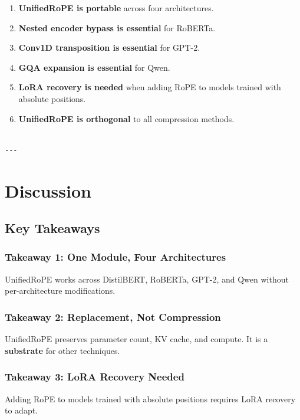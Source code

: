 \begin{enumerate}
\item \textbf{UnifiedRoPE is portable} across four architectures.
\item \textbf{Nested encoder bypass is essential} for RoBERTa.
\item \textbf{Conv1D transposition is essential} for GPT-2.
\item \textbf{GQA expansion is essential} for Qwen.
\item \textbf{LoRA recovery is needed} when adding RoPE to models trained with
  absolute positions.
\item \textbf{UnifiedRoPE is orthogonal} to all compression methods.
\end{enumerate}
\begin{lstlisting}

---
\end{lstlisting}


\section{Discussion}

\subsection{Key Takeaways}

\subsubsection{Takeaway 1: One Module, Four Architectures}

UnifiedRoPE works across DistilBERT, RoBERTa, GPT-2, and Qwen without 
per-architecture modifications.

\subsubsection{Takeaway 2: Replacement, Not Compression}

UnifiedRoPE preserves parameter count, KV cache, and compute. It is a 
\textbf{substrate} for other techniques.

\subsubsection{Takeaway 3: LoRA Recovery Needed}

Adding RoPE to models trained with absolute positions requires LoRA 
recovery to adapt.

